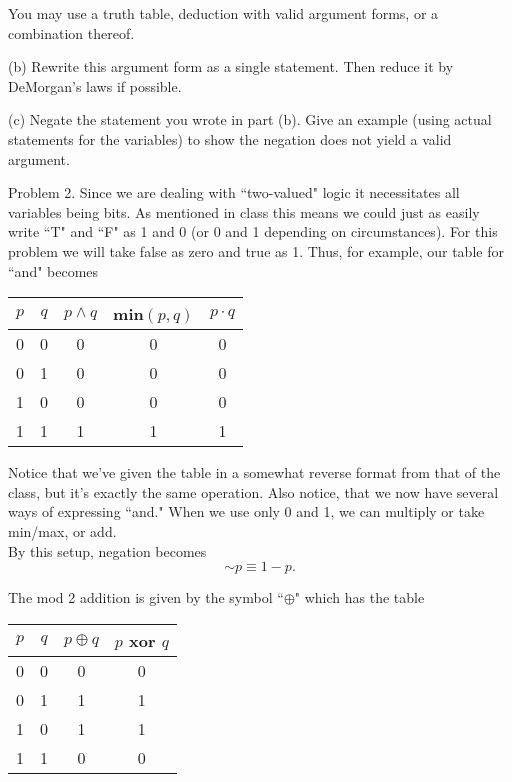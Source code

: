 \documentclass[16 pt]{amsart}
\theoremstyle{definition}
\theoremstyle{remark}
\numberwithin{equation}{subsection}
\begin{document}
You may use a truth table, deduction with valid argument forms, or a combination thereof.\\

\vspace{1in}

(b) Rewrite this argument form as a single statement. Then reduce it by DeMorgan's laws if possible.

\vspace{.5in}

(c) Negate the statement you wrote in part (b).  Give an example (using actual statements for the variables) to show the negation does not yield a valid argument.

\newpage

Problem 2. Since we are dealing with ``two-valued" logic it necessitates all variables being bits.  As mentioned in class this means we could just as easily write ``T" and ``F" as 1 and 0 (or 0 and 1 depending on circumstances).  For this problem we will take false as zero and true as 1.  Thus, for example, our table for ``and" becomes

\begin{center}
\begin{tabular}{c | c | c | c | c }
$p$ & $q$ & $p\wedge q$ & min$(p,q)$ & $p\cdot q$\\ 
\hline
0 & 0 & 0 & 0 & 0\\
0 & 1 & 0 & 0 & 0\\
1 & 0 & 0 & 0 & 0\\
1 & 1 & 1 & 1 & 1
\end{tabular}
\end{center}


Notice that we've given the table in a somewhat reverse format from that of the class, but it's exactly the same operation.  Also notice, that we now have several ways of expressing ``and." When we use only 0 and 1, we can multiply or take min/max, or add.\\

By this setup, negation becomes
\[
\sim p \equiv 1 - p.
\]

The mod 2 addition is given by the symbol ``$\oplus$" which has the table

\begin{center}
\begin{tabular}{c | c | c | c }
$p$ & $q$ & $p\oplus q$ & $p$ xor $q$\\ 
\hline
0 & 0 & 0 & 0 \\
0 & 1 & 1 & 1 \\
1 & 0 & 1 & 1 \\
1 & 1 & 0 & 0 
\end{tabular}
\end{center}
\end{document}
